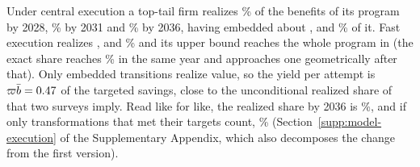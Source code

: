 Under central execution a top-tail firm realizes \PaceCenEight\% of the benefits of its program by 2028, \PaceCenOne\% by 2031 and \PaceCenSix\% by 2036, having embedded about \CenEmbEight, \CenEmbOne{} and \CenEmbSix\% of it. Fast execution realizes \PaceFastEight, \PaceFastOne{} and \PaceFastSix\% and its upper bound reaches the whole program in \PaceFastDone{} (the exact share reaches \PayDoneShare\% in the same year and approaches one geometrically after that). Only embedded transitions realize value, so the yield per attempt is $\varpi\bar b=0.47$ of the targeted savings, close to the unconditional realized share of \YieldMck{} that two surveys imply. Read like for like, the realized share by 2036 is \ShareExec\%, and if only transformations that met their targets count, \ShareBcgWin\% (Section~\ref{supp:model-execution} of the Supplementary Appendix, which also decomposes the change from the first version).

